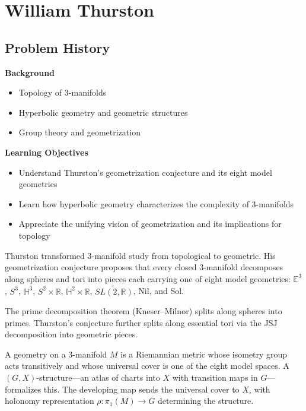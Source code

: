 \chapter{William Thurston}

\section*{Problem History}

\begin{prereqs}
\noindent \textbf{Background}
\begin{itemize}
\item Topology of 3-manifolds
\item Hyperbolic geometry and geometric structures
\item Group theory and geometrization
\end{itemize}
\end{prereqs}

\begin{objectives}
\noindent \textbf{Learning Objectives}
\begin{itemize}
\item Understand Thurston's geometrization conjecture and its eight model geometries
\item Learn how hyperbolic geometry characterizes the complexity of 3-manifolds
\item Appreciate the unifying vision of geometrization and its implications for topology
\end{itemize}
\end{objectives}

Thurston \cite{thurston1997} transformed 3-manifold study from topological to geometric. His
geometrization conjecture proposes that every closed 3-manifold decomposes
along spheres and tori into pieces each carrying one of eight model
geometries: $\mathbb{E}^3$, $S^3$, $\mathbb{H}^3$, $S^2 \times \mathbb{R}$,
$\mathbb{H}^2 \times \mathbb{R}$, $\widetilde{SL(2,\mathbb{R})}$, Nil,
and Sol.

The prime decomposition theorem (Kneser--Milnor) splits along spheres
into primes. Thurston's conjecture further splits along essential tori
via the JSJ decomposition into geometric pieces.

A geometry on a 3-manifold $M$ is a Riemannian metric whose isometry
group acts transitively and whose universal cover is one of the eight
model spaces. A $(G, X)$-structure---an atlas of charts into $X$ with
transition maps in $G$---formalizes this. The developing map sends the
universal cover to $X$, with holonomy representation
$\rho: \pi_1(M) \to G$ determining the structure.

